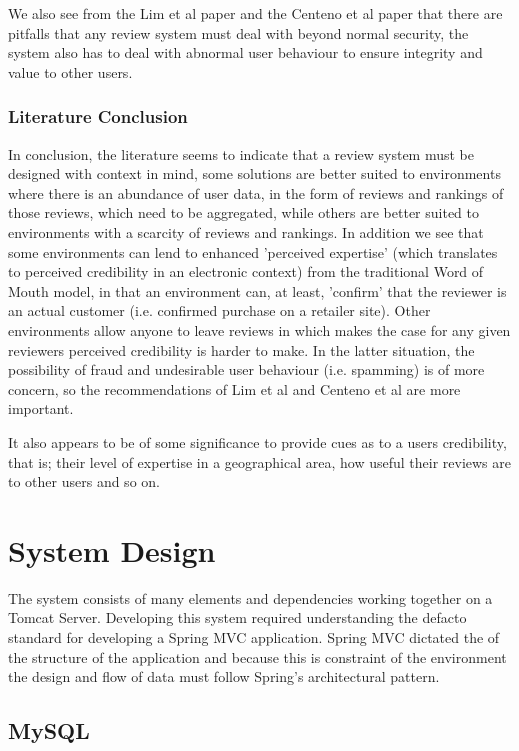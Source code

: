 We also see from the Lim et al paper\cite{Lim} and the Centeno et al\cite{Centeno} paper that there are pitfalls that any review system must deal with beyond normal security, the system also has to deal with abnormal user behaviour to ensure integrity and value to other users.

\subsection{Literature Conclusion}
In conclusion, the literature seems to indicate that a review system must be designed with context in mind, some solutions are better suited to environments where there is an abundance of user data, in the form of reviews and rankings of those reviews, which need to be aggregated, while others are better suited to environments with a scarcity of reviews and rankings. In addition we see that some environments can lend to enhanced 'perceived expertise' (which translates to perceived credibility in an electronic context) from the traditional Word of Mouth model, in that an environment can, at least, 'confirm' that the reviewer is an actual customer (i.e. confirmed purchase on a retailer site). Other environments allow anyone to leave reviews in which makes the case for any given reviewers perceived credibility is harder to make. In the latter situation, the possibility of fraud and undesirable user behaviour (i.e. spamming) is of more concern, so the recommendations of \cite{Lim}Lim et al and \cite{Centeno}Centeno et al are more important.

It also appears to be of some significance to provide cues as to a users credibility, that is; their level of expertise in a geographical area, how useful their reviews are to other users and so on\cite{Lopez}.


\chapter{System Design}

The system consists of many elements and dependencies working together on a Tomcat Server. Developing this system required understanding the defacto standard for developing a Spring MVC application. Spring MVC dictated the of the structure of the application and because this is constraint of the environment the design and flow of data must follow Spring's architectural pattern.

\section{MySQL}

